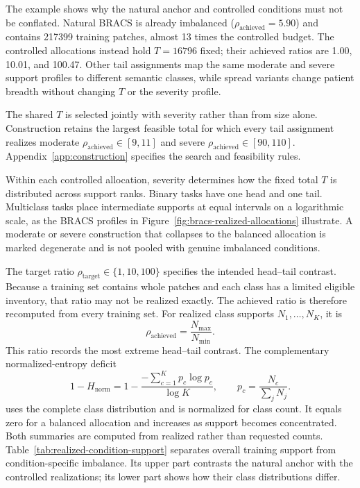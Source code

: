 \documentclass[11pt]{article}
\newcommand{\Hnorm}{1-H_{\mathrm{norm}}}
\begin{document}
\noindent The example shows why the natural anchor and controlled conditions must not be conflated. Natural BRACS is already imbalanced ($\rho_{\mathrm{achieved}}=\num{5.90}$) and contains \num{217399} training patches, almost 13 times the controlled budget. The controlled allocations instead hold $T=\num{16796}$ fixed; their achieved ratios are \num{1.00}, \num{10.01}, and \num{100.47}. Other tail assignments map the same moderate and severe support profiles to different semantic classes, while spread variants change patient breadth without changing $T$ or the severity profile.

\noindent The shared $T$ is selected jointly with severity rather than from size alone. Construction retains the largest feasible total for which every tail assignment realizes moderate $\rho_{\mathrm{achieved}}\in[9,11]$ and severe $\rho_{\mathrm{achieved}}\in[90,110]$. Appendix~\ref{app:construction} specifies the search and feasibility rules.

Within each controlled allocation, severity determines how the fixed total $T$ is distributed across support ranks. Binary tasks have one head and one tail. Multiclass tasks place intermediate supports at equal intervals on a logarithmic scale, as the BRACS profiles in Figure~\ref{fig:bracs-realized-allocations} illustrate. A moderate or severe construction that collapses to the balanced allocation is marked degenerate and is not pooled with genuine imbalanced conditions.

The target ratio $\rho_{\mathrm{target}}\in\{1,10,100\}$ specifies the intended head--tail contrast. Because a training set contains whole patches and each class has a limited eligible inventory, that ratio may not be realized exactly. The achieved ratio is therefore recomputed from every training set. For realized class supports $N_1,\ldots,N_K$, it is
\begin{equation}
  \rho_{\mathrm{achieved}}=\frac{N_{\max}}{N_{\min}}.
  \label{eq:rho}
\end{equation}
This ratio records the most extreme head--tail contrast. The complementary normalized-entropy deficit
\begin{equation}
  \Hnorm=1-\frac{-\sum_{c=1}^{K}p_c\log p_c}{\log K},
  \qquad p_c=\frac{N_c}{\sum_jN_j}.
  \label{eq:entropy}
\end{equation}
\noindent uses the complete class distribution and is normalized for class count. It equals zero for a balanced allocation and increases as support becomes concentrated. Both summaries are computed from realized rather than requested counts. Table~\ref{tab:realized-condition-support} separates overall training support from condition-specific imbalance. Its upper part contrasts the natural anchor with the controlled realizations; its lower part shows how their class distributions differ.
\end{document}
